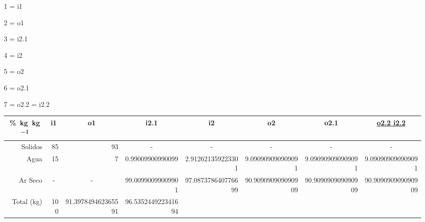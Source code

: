 \documentclass[12pt]{article}
\begin{document}
\begin{center}

\begin{itemize}
\begin{multicols}{4}
	
	\item 1 = i1
	\item 2 = o1
	\item 3 = i2.1
	\item 4 = i2
	\item 5 = o2
	\item 6 = o2.1
	\item 7 = o2.2 = i2.2
	
\end{multicols}
\end{itemize}

\vspace{5mm}

\begin{tabular}{r *{7}{r} }

	\multicolumn{1}{c}{\unit{\percent.\kg\per\kg}}
	& \multicolumn{1}{c}{i1}
	& \multicolumn{1}{c}{o1}
	& \multicolumn{1}{c}{i2.1}
	& \multicolumn{1}{c}{i2}
	& \multicolumn{1}{c}{o2}
	& \multicolumn{1}{c}{o2.1}
	& \multicolumn{1}{c}{\underline{o2.2 i2.2}}
	
	\\ \midrule
	
	Solidos
	& 85
	& 93
	& \multicolumn{1}{c}{-}
	& \multicolumn{1}{c}{-}
	& \multicolumn{1}{c}{-}
	& \multicolumn{1}{c}{-}
	& \multicolumn{1}{c}{-}
	
	
	\\
	
	Agua
	& 15
	& 7
	& \num[scientific-notation=false]{0.99009900990099}
	& \num{2.912621359223301}
	& \num{9.090909090909091}
	& \num{9.090909090909091}
	& \num{9.090909090909091}
	
	\\
	
	Ar Seco
	& \multicolumn{1}{c}{-}
	& \multicolumn{1}{c}{-}
	& \num{99.00990099009901}
	& \num{97.087378640776699}
	& \num{90.909090909090909}
	& \num{90.909090909090909}
	& \num{90.909090909090909}
	
	\\ \midrule
	
	Total (\unit{\kg})
	& 100
	& \num[round-precision=1]{91.397849462365591}
	& \num[round-precision=1]{96.535244922341694}
	& 
	& 
	& 
	& 

\end{tabular}

\end{center}
\end{document}
